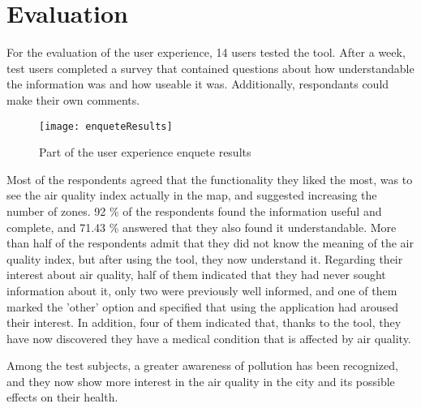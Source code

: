 \newpage
\section{Evaluation}
For the evaluation of the user experience, 14 users tested the tool.
After a week, test users completed a survey that contained questions about how understandable the information was
and how useable it was. Additionally, respondants could make their own comments.
\begin{figure}[ht]
   \centering
   \texttt{[image: enqueteResults]}
   \caption{Part of the user experience enquete results}
\end{figure}

Most of the respondents agreed that the functionality they liked the most, was to see the air quality index actually in the
map, and suggested increasing the number of zones.
92 \% of the respondents found the information useful and complete, and 71.43 \% answered that they also found it
understandable.
More than half of the respondents admit that they did not know the meaning of the air quality index, but after
using the tool, they now understand it.
Regarding their interest about air quality, half of them indicated that they had never sought information about it,
only two were previously well informed, and one of them marked the 'other' option and specified that using the application had aroused their interest.
In addition, four of them indicated that, thanks to the tool, they have now discovered they have a medical condition that is affected by air quality.

Among the test subjects, a greater awareness of pollution has been recognized, and they now show more interest in the
air quality in the city and its possible effects on their health.

